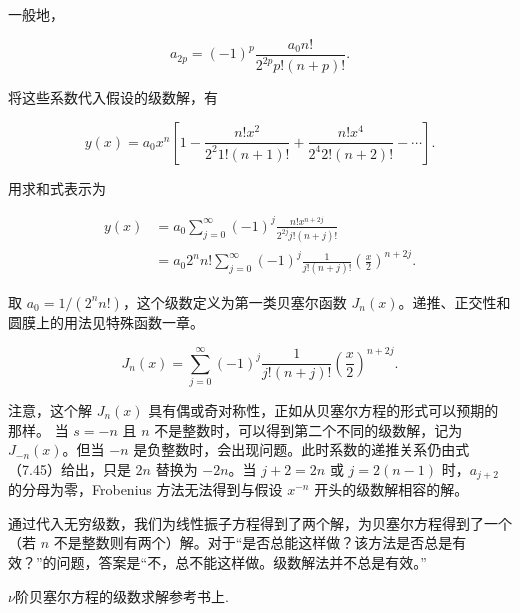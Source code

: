 一般地，

$$
a_{2 p}=(-1)^p \frac{a_0 n!}{2^{2 p} p!(n+p)!} .
$$

将这些系数代入假设的级数解，有

$$
y(x)=a_0 x^n\left[1-\frac{n!x^2}{2^2 1!(n+1)!}+\frac{n!x^4}{2^4 2!(n+2)!}-\cdots\right] .
$$

用求和式表示为

$$
\begin{aligned}
y(x) & =a_0 \sum_{j=0}^{\infty}(-1)^j \frac{n!x^{n+2 j}}{2^{2 j} j!(n+j)!} \\
& =a_0 2^n n!\sum_{j=0}^{\infty}(-1)^j \frac{1}{j!(n+j)!}\left(\frac{x}{2}\right)^{n+2 j} .
\end{aligned}
$$

取 $a_0=1/(2^n n!)$，这个级数定义为第一类贝塞尔函数 $J_n(x)$。递推、正交性和圆膜上的用法见特殊函数一章。

$$
J_n(x)=\sum_{j=0}^{\infty}(-1)^j \frac{1}{j!(n+j)!}\left(\frac{x}{2}\right)^{n+2 j} .
$$

注意，这个解 $J_n(x)$ 具有偶或奇对称性，正如从贝塞尔方程的形式可以预期的那样。
当 $s=-n$ 且 $n$ 不是整数时，可以得到第二个不同的级数解，记为 $J_{-n}(x)$。但当 $-n$ 是负整数时，会出现问题。此时系数的递推关系仍由式（7.45）给出，只是 $2n$ 替换为 $-2n$。当 $j+2=2n$ 或 $j=2(n-1)$ 时，$a_{j+2}$ 的分母为零，Frobenius 方法无法得到与假设 $x^{-n}$ 开头的级数解相容的解。

通过代入无穷级数，我们为线性振子方程得到了两个解，为贝塞尔方程得到了一个（若 $n$ 不是整数则有两个）解。对于“是否总能这样做？该方法是否总是有效？”的问题，答案是“不，总不能这样做。级数解法并不总是有效。”






$\nu$阶贝塞尔方程的级数求解参考书上.





